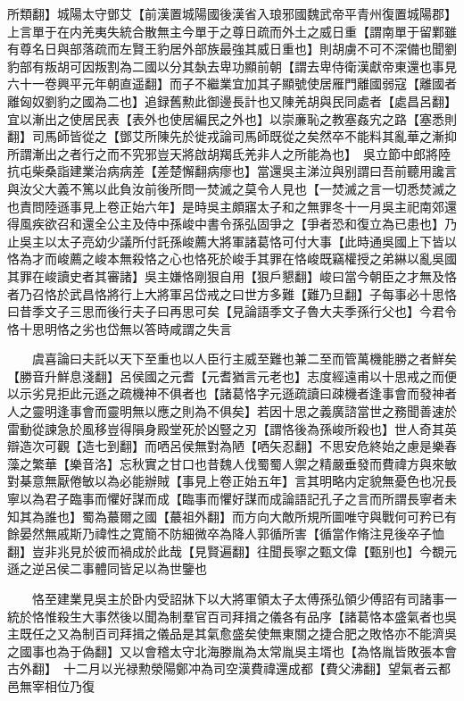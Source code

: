 所類翻】城陽太守鄧艾【前漢置城陽國後漢省入琅邪國魏武帝平青州復置城陽郡】上言單于在内羌夷失統合散無主今單于之尊日疏而外土之威日重【謂南單于留鄴雖有尊名日與部落疏而左賢王豹居外部族最強其威日重也】則胡虜不可不深備也聞劉豹部有叛胡可因叛割為二國以分其埶去卑功顯前朝【謂去卑侍衛漢獻帝東還也事見六十一卷興平元年朝直遥翻】而子不繼業宜加其子顯號使居雁門離國弱寇【離國者離匈奴劉豹之國為二也】追録舊勲此御邊長計也又陳羌胡與民同處者【處昌呂翻】宜以漸出之使居民表【表外也使居編民之外也】以崇亷恥之教塞姦宄之路【塞悉則翻】司馬師皆從之【鄧艾所陳先於徙戎論司馬師既從之矣然卒不能料其亂華之漸抑所謂漸出之者行之而不究邪豈天將啟胡羯氐羌非人之所能為也】　吳立節中郎將陸抗屯柴桑詣建業治病病差【差楚懈翻病瘳也】當還吳主涕泣與别謂曰吾前聽用讒言與汝父大義不篤以此負汝前後所問一焚滅之莫令人見也【一焚滅之言一切悉焚滅之也責問陸遜事見上卷正始六年】是時吳主頗寤太子和之無罪冬十一月吳主祀南郊還得風疾欲召和還全公主及侍中孫峻中書令孫弘固爭之【爭者恐和復立為已患也】乃止吳主以太子亮幼少議所付託孫峻薦大將軍諸葛恪可付大事【此時通吳國上下皆以恪為才而峻薦之峻本無殺恪之心也恪死於峻手其罪在恪峻既竊權授之弟綝以亂吳國其罪在峻讀史者其審諸】吳主嫌恪剛狠自用【狠戶懇翻】峻曰當今朝臣之才無及恪者乃召恪於武昌恪將行上大將軍呂岱戒之曰世方多難【難乃旦翻】子每事必十思恪曰昔季文子三思而後行夫子曰再思可矣【見論語季文子魯大夫季孫行父也】今君令恪十思明恪之劣也岱無以答時咸謂之失言

　　虞喜論曰夫託以天下至重也以人臣行主威至難也兼二至而管萬機能勝之者鮮矣【勝音升鮮息淺翻】呂侯國之元耆【元耆猶言元老也】志度經遠甫以十思戒之而便以示劣見拒此元遜之疏機神不俱者也【諸葛恪字元遜疏讀曰疎機者逢事會而發神者人之靈明逢事會而靈明無以應之則為不俱矣】若因十思之義廣諮當世之務聞善速於雷動從諫急於風移豈得隕身殿堂死於凶豎之刃【謂恪後為孫峻所殺也】世人奇其英辯造次可觀【造七到翻】而哂呂侯無對為陋【哂矢忍翻】不思安危終始之慮是樂春藻之繁華【樂音洛】忘秋實之甘口也昔魏人伐蜀蜀人禦之精嚴垂發而費禕方與來敏對棊意無厭倦敏以為必能辦賊【事見上卷正始五年】言其明略内定貌無憂色也况長寧以為君子臨事而懼好謀而成【臨事而懼好謀而成論語記孔子之言而所謂長寧者未知其為誰也】蜀為蕞爾之國【蕞祖外翻】而方向大敵所規所圖唯守與戰何可矜已有餘晏然無戚斯乃禕性之寛簡不防細微卒為降人郭循所害【循當作脩注見後卒子恤翻】豈非兆見於彼而禍成於此哉【見賢遍翻】往聞長寧之甄文偉【甄别也】今覩元遜之逆呂侯二事體同皆足以為世鑒也

　　恪至建業見吳主於卧内受詔牀下以大將軍領太子太傅孫弘領少傅詔有司諸事一統於恪惟殺生大事然後以聞為制羣官百司拜揖之儀各有品序【諸葛恪本盛氣者也吳主既任之又為制百司拜揖之儀品是其氣愈盛矣使無東關之捷合肥之敗恪亦不能濟吳之國事也為于偽翻】又以會稽太守北海滕胤為太常胤吳主壻也【為恪胤皆敗張本會古外翻】　十二月以光禄勲滎陽鄭冲為司空漢費禕還成都【費父沸翻】望氣者云都邑無宰相位乃復

